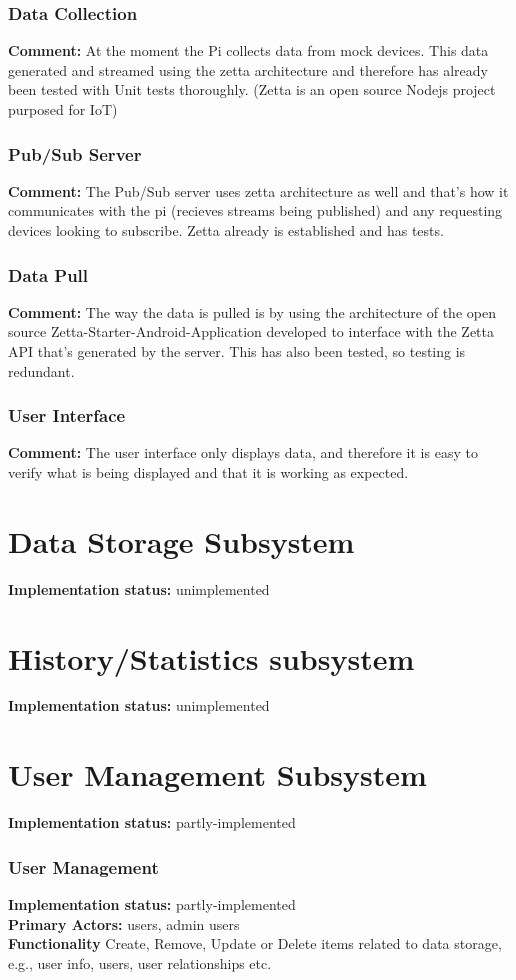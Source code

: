 \documentclass[12pt]{article}
\begin{document}
{	\subsubsection{Data Collection}
	\textbf{Comment:} At the moment the Pi collects data from mock devices. This data generated and streamed using the zetta architecture and therefore has already been tested with Unit tests thoroughly. (Zetta is an open source Nodejs project purposed for IoT)
	\subsubsection{Pub/Sub Server}
	\textbf{Comment:} The Pub/Sub server uses zetta architecture as well and that's how it communicates with the pi (recieves streams being published) and any requesting devices looking to subscribe. Zetta already is established and has tests.
	\subsubsection{Data Pull}
	\textbf{Comment:} The way the data is pulled is by using the architecture of the open source Zetta-Starter-Android-Application developed to interface with the Zetta API that's generated by the server. This has also been tested, so testing is redundant.
	\subsubsection{User Interface}
	\textbf{Comment:} The user interface only displays data, and therefore it is easy to verify what is being displayed and that it is working as expected.

	\section{Data Storage Subsystem}
	\textbf{Implementation status:} unimplemented

	\section{History/Statistics subsystem}
	\textbf{Implementation status:} unimplemented

	\section{User Management Subsystem }
	\textbf{Implementation status:} partly-implemented


	\subsubsection{User Management}
	\textbf{Implementation status:} partly-implemented \\
	\textbf{Primary Actors:} users, admin users \\
	\textbf{Functionality} Create, Remove, Update or Delete items related to data storage, e.g., user info, users, user relationships etc.  \\
}
\end{document}
